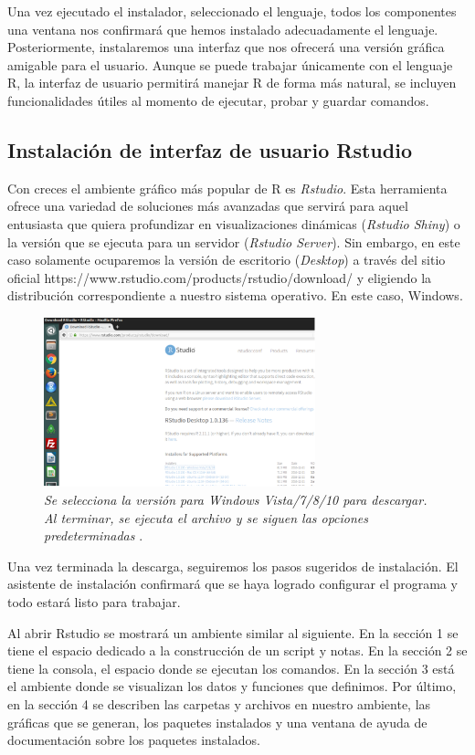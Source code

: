 \documentclass[letterpaper,12pt, spanish, oneside]{book} %
\begin{document}
Una vez ejecutado el instalador, seleccionado el lenguaje, todos los componentes  una ventana nos confirmará que hemos instalado adecuadamente el lenguaje. Posteriormente, instalaremos una interfaz que nos ofrecerá una versión gráfica amigable para el usuario. Aunque se puede trabajar únicamente con el lenguaje R, la interfaz de usuario permitirá manejar R de forma más natural, se incluyen funcionalidades útiles al momento de ejecutar, probar y guardar comandos.

\subsection{Instalación de interfaz de usuario Rstudio}

Con creces el ambiente gráfico más popular de R es \textit{Rstudio}. Esta herramienta ofrece una variedad de soluciones más avanzadas que servirá para aquel entusiasta que quiera profundizar en visualizaciones dinámicas (\textit{Rstudio Shiny}) o la versión que se ejecuta para un servidor (\textit{Rstudio Server}). Sin embargo, en este caso solamente ocuparemos la versión de escritorio (\textit{Desktop}) a través del sitio oficial https://www.rstudio.com/products/rstudio/download/ y eligiendo la distribución correspondiente a nuestro sistema operativo. En este caso, Windows. 

\begin{figure}[H]
\centering
\includegraphics[width=0.7\textwidth]{t3.png}
\caption{\label{fig:frog2}\textit{Se selecciona la versión para Windows Vista/7/8/10 para descargar. Al terminar, se ejecuta el archivo y se siguen las opciones predeterminadas }.}
\end{figure}

Una vez terminada la descarga, seguiremos los pasos sugeridos de instalación. El asistente de instalación confirmará que se haya logrado configurar el programa y todo estará listo para trabajar.

Al abrir Rstudio se mostrará un ambiente similar al siguiente. En la sección 1 se tiene el espacio dedicado a la construcción de un script y notas. En la sección 2 se tiene la consola, el espacio donde se ejecutan los comandos. En la sección 3 está el ambiente donde se visualizan los datos y funciones que definimos. Por último, en la sección 4 se describen las carpetas y archivos en nuestro ambiente, las gráficas que se generan, los paquetes instalados y una ventana de ayuda de documentación sobre los paquetes instalados.
\end{document}
